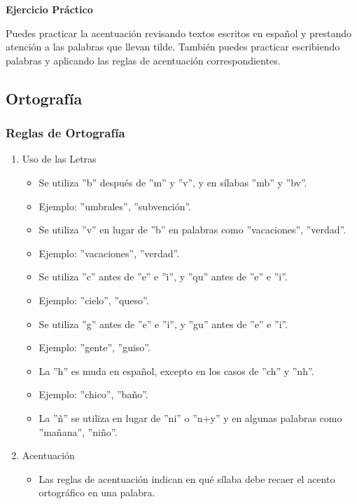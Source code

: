 \textbf{Ejercicio Práctico}

Puedes practicar la acentuación revisando textos escritos en español y prestando atención a las palabras que llevan tilde. También puedes practicar escribiendo palabras y aplicando las reglas de acentuación correspondientes.

\subsection{Ortografía}

\subsubsection{Reglas de Ortografía}

\begin{enumerate}
      \item Uso de las Letras
            \begin{itemize}
                  \item Se utiliza ''b'' después de ''m'' y ''v'', y en sílabas ''mb'' y ''bv''.
                  \item Ejemplo: ''umbrales'', ''subvención''.
                  \item Se utiliza ''v'' en lugar de ''b'' en palabras como ''vacaciones'', ''verdad''.
                  \item Ejemplo: ''vacaciones'', ''verdad''.
                  \item Se utiliza ''c'' antes de ''e'' e ''i'', y ''qu'' antes de ''e'' e ''i''.
                  \item Ejemplo: ''cielo'', ''queso''.
                  \item Se utiliza ''g'' antes de ''e'' e ''i'', y ''gu'' antes de ''e'' e ''i''.
                  \item Ejemplo: ''gente'', ''guiso''.
                  \item La ''h'' es muda en español, excepto en los casos de ''ch'' y ''nh''.
                  \item Ejemplo: ''chico'', ''baño''.
                  \item La ''ñ'' se utiliza en lugar de ''ni'' o ''n+y'' y en algunas palabras como ''mañana'', ''niño''.
            \end{itemize}
      \item Acentuación
            \begin{itemize}
                  \item Las reglas de acentuación indican en qué sílaba debe recaer el acento ortográfico en una palabra.

\end{itemize}
\end{enumerate}
